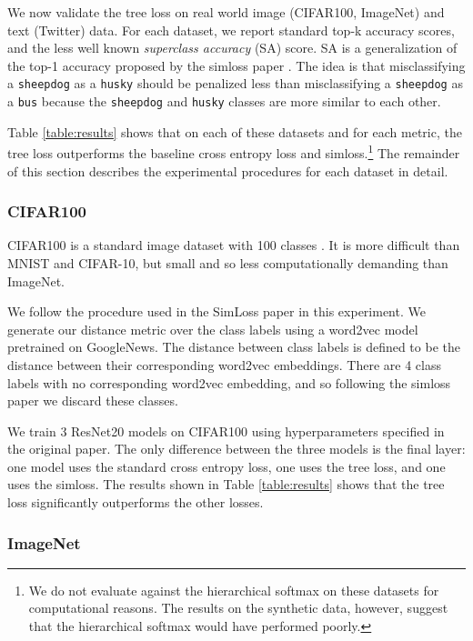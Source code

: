 \documentclass[twoside]{article}
\begin{document}
We now validate the tree loss on real world image (CIFAR100, ImageNet) and text (Twitter) data.
For each dataset, we report standard top-k accuracy scores,
and the less well known \emph{superclass accuracy} (SA) score.
SA is a generalization of the top-1 accuracy proposed by the simloss paper \citep{Kobs2020SimLossCS}.
The idea is that misclassifying a \texttt{sheepdog} as a \texttt{husky} should be penalized less than misclassifying a \texttt{sheepdog} as a \texttt{bus} because the \texttt{sheepdog} and \texttt{husky} classes are more similar to each other.

Table \ref{table:results} shows that on each of these datasets and for each metric,
the tree loss outperforms the baseline cross entropy loss and simloss.\footnote{We do not evaluate against the hierarchical softmax on these datasets for computational reasons.  The results on the synthetic data, however, suggest that the hierarchical softmax would have performed poorly.}
The remainder of this section describes the experimental procedures for each dataset in detail.

\subsubsection{CIFAR100}

CIFAR100 is a standard image dataset with 100 classes \citep{krizhevsky2009learning}.
It is more difficult than MNIST and CIFAR-10,
but small and so less computationally demanding than ImageNet.

We follow the procedure used in the SimLoss paper \citep{Kobs2020SimLossCS} in this experiment.
We generate our distance metric over the class labels using a word2vec model \citep{Mikolov2013EfficientEO} pretrained on GoogleNews.
The distance between class labels is defined to be the distance between their corresponding word2vec embeddings.
There are 4 class labels with no corresponding word2vec embedding,
and so following the simloss paper we discard these classes.

We train 3 ResNet20 models on CIFAR100 \citep{He2016DeepRL} using hyperparameters specified in the original paper.
The only difference between the three models is the final layer:
one model uses the standard cross entropy loss, one uses the tree loss, and one uses the simloss.
The results shown in Table \ref{table:results} shows that the tree loss significantly outperforms the other losses.

\subsubsection{ImageNet}
\end{document}
